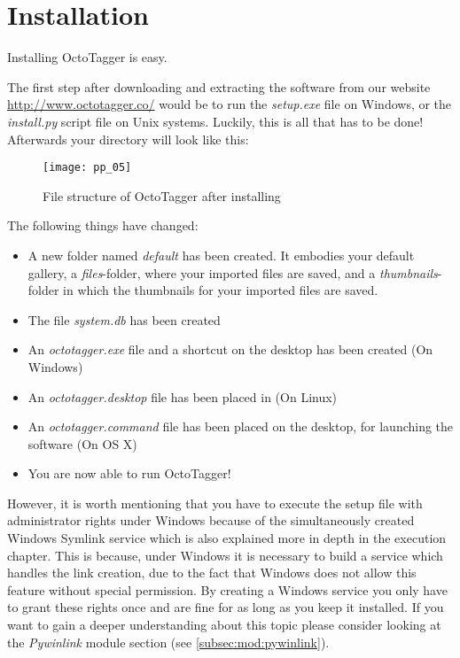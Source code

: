 \section{Installation}
Installing OctoTagger is easy.

The first step after downloading and extracting the software from our website \url{http://www.octotagger.co/} would be to run the \textit{setup.exe} file on Windows, or the \emph{install.py} script file on Unix systems. Luckily, this is all that has to be done! Afterwards your directory will look like this:

\begin{figure}[H]
    \centering
	\texttt{[image: pp\_05]}
	\caption{File structure of OctoTagger after installing}
\end{figure}


The following things have changed:
\begin{itemize}
	\item A new folder named \emph{default} has been created. It embodies your default gallery, a \emph{files}-folder, where your imported files are saved, and a \emph{thumbnails}-folder in which the thumbnails for your imported files are saved.
	\item The file \textit{system.db} has been created
	\item An \emph{octotagger.exe} file and a shortcut on the desktop has been created (On Windows)
	\item An \emph{octotagger.desktop} file has been placed in  (On Linux) 
	\item An \emph{octotagger.command} file has been placed on the desktop, for launching the software (On OS X)
	\item You are now able to run OctoTagger!
\end{itemize}

However, it is worth mentioning that you have to execute the setup file with administrator rights under Windows because of the simultaneously created Windows Symlink service which is also explained more in depth in the execution chapter. This is because, under Windows it is necessary to build a service which handles the link creation, due to the fact that Windows does not allow this feature without special permission. By creating a Windows service you only have to grant these rights once and are fine for as long as you keep it installed. If you want to gain a deeper understanding about this topic please consider looking at the \textit{Pywinlink} module section (see \cref{subsec:mod:pywinlink}).

